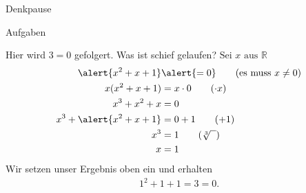 %
%
%
%


{
\begin{frame}[fragile]{Denkpause}
	\begin{alertblock}{Aufgaben}
		\small{
			\begin{block}{Hier wird $3=0$ gefolgert. Was ist schief gelaufen?}
				$\text{Sei }x\text{ aus }\mathbb{R}$
				\begin{align*}
					\alert{x^2 + x + 1}       & \alert{= 0} \tag{es muss $x\neq0$} \\
					x(x^2 + x + 1)            & = x \cdot 0 \tag{$\cdot x$}        \\
					x^3 + x^2 + x             & = 0                                \\
					x^3 + \alert{x^2 + x + 1} & = 0 + 1\tag{$+ 1$}                 \\
					x^3                       & = 1\tag{$\sqrt[3]{\phantom{x}}$}   \\
					x                         & = 1
				\end{align*}
				Wir setzen unser Ergebnis oben ein und erhalten
				\begin{align*}
					1^2 + 1 + 1= 3 = 0\text{.}
				\end{align*}
			\end{block}
		}
	\end{alertblock}
\end{frame}
}

